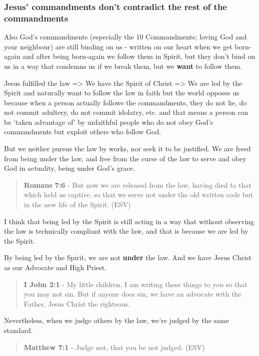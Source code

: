 \documentclass[11pt]{article}
\begin{document}
\subsubsection{Jesus' commandments don't contradict the rest of the commandments}
\label{sec:orgab2c3fe}
Also God's commandments (especially the 10 Commandments; loving God and your neighbour) are still binding on us - written on our heart when we get born-again and after being born-again we follow them in Spirit, but they don't bind on us in a way that condemns us if we  break them, but we \textbf{want} to follow them.

Jesus fulfilled the law => We have the Spirit of Christ => We are led by the Spirit and naturally want to follow the law in faith but the world opposes us because when a person actually follows the commandments, they do not lie, do not commit adultery, do not commit idolatry, etc. and that means a person can be 'taken advantage of' by unfaithful people who do not obey God's commandments but exploit others who follow God.

But we neither pursue the law by works, nor seek it to be justified.
We are freed from being under the law, and free from the curse of the law to serve and obey God in actuality, being under God's grace.

\begin{quote}
\textbf{Romans 7:6} - But now we are released from the law, having died to that which held us captive, so that we serve not under the old written code but in the new life of the Spirit. (ESV)
\end{quote}

I think that being led by the Spirit is still acting in a way that without observing the law is technically compliant with the law, and that is because we are led by the Spirit.

By being led by the Spirit, we are not \textbf{under} the law. And we have Jesus Christ as our Advocate and High Priest.

\begin{quote}
\textbf{I John 2:1} - My little children, I am writing these things to you so that you may not sin. But if anyone does sin, we have an advocate with the Father, Jesus Christ the righteous.
\end{quote}

Nevertheless, when we judge others by the law, we're judged by the same standard.

\begin{quote}
\textbf{Matthew 7:1} - Judge not, that you be not judged. (ESV)
\end{quote}
\end{document}
